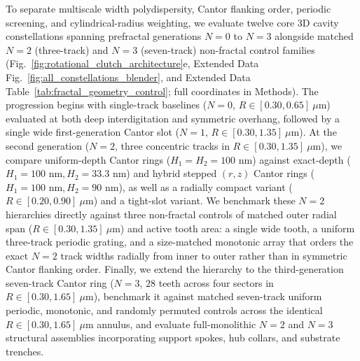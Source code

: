\documentclass[pdflatex,sn-nature]{sn-jnl}
\begin{document}
To separate multiscale width polydispersity, Cantor flanking order, periodic screening, and cylindrical-radius weighting, we evaluate twelve core 3D cavity constellations spanning prefractal generations $N=0$ to $N=3$ alongside matched $N=2$ (three-track) and $N=3$ (seven-track) non-fractal control families (Fig.~\ref{fig:rotational_clutch_architecture}e, Extended Data Fig.~\ref{fig:all_constellations_blender}, and Extended Data Table~\ref{tab:fractal_geometry_control}; full coordinates in Methods). The progression begins with single-track baselines ($N=0$, $R \in [0.30, 0.65]\ \mu\text{m}$) evaluated at both deep interdigitation and symmetric overhang, followed by a single wide first-generation Cantor slot ($N=1$, $R \in [0.30, 1.35]\ \mu\text{m}$). At the second generation ($N=2$, three concentric tracks in $R \in [0.30, 1.35]\ \mu\text{m}$), we compare uniform-depth Cantor rings ($H_1 = H_2 = 100\text{ nm}$) against exact-depth ($H_1 = 100\text{ nm}, H_2 = 33.3\text{ nm}$) and hybrid stepped $(r,z)$ Cantor rings ($H_1 = 100\text{ nm}, H_2 = 90\text{ nm}$), as well as a radially compact variant ($R \in [0.20, 0.90]\ \mu\text{m}$) and a tight-slot variant. We benchmark these $N=2$ hierarchies directly against three non-fractal controls of matched outer radial span ($R \in [0.30, 1.35]\ \mu\text{m}$) and active tooth area: a single wide tooth, a uniform three-track periodic grating, and a size-matched monotonic array that orders the exact $N=2$ track widths radially from inner to outer rather than in symmetric Cantor flanking order. Finally, we extend the hierarchy to the third-generation seven-track Cantor ring ($N=3$, $28$ teeth across four sectors in $R \in [0.30, 1.65]\ \mu\text{m}$), benchmark it against matched seven-track uniform periodic, monotonic, and randomly permuted controls across the identical $R \in [0.30, 1.65]\ \mu\text{m}$ annulus, and evaluate full-monolithic $N=2$ and $N=3$ structural assemblies incorporating support spokes, hub collars, and substrate trenches.
\end{document}
